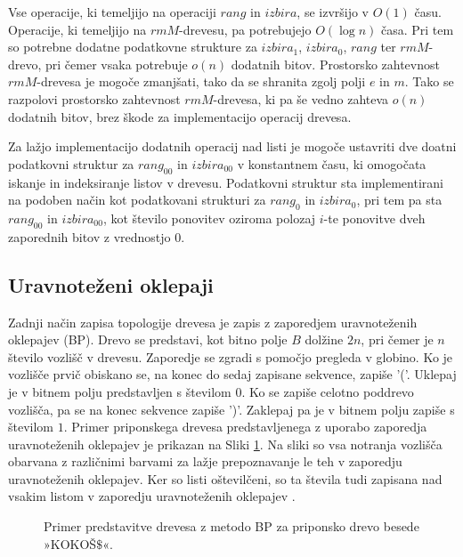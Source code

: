 Vse operacije, ki temeljijo na operaciji $rang$ in $izbira$, se izvršijo v $O(1)$ času. Operacije, ki temeljijo na $rmM$-drevesu, pa potrebujejo $O(\log{n})$ časa. Pri tem so potrebne dodatne podatkovne strukture za $izbira_1$, $izbira_0$, $rang$ ter $rmM$-drevo, pri čemer vsaka potrebuje $o(n)$ dodatnih bitov. Prostorsko zahtevnost $rmM$-drevesa je mogoče zmanjšati, tako da se shranita zgolj polji $e$ in $m$. Tako se razpolovi prostorsko zahtevnost $rmM$-drevesa, ki pa še vedno zahteva $o(n)$ dodatnih bitov, brez škode za implementacijo operacij drevesa.

Za lažjo implementacijo dodatnih operacij nad listi je mogoče ustavriti dve doatni podatkovni struktur za $rang_{00}$ in $izbira_{00}$ v konstantnem času, ki omogočata iskanje in indeksiranje listov v drevesu. Podatkovni struktur sta implementirani na podoben način kot podatkovani strukturi za $rang_0$ in $izbira_0$, pri tem pa sta $rang_{00}$ in $izbira_{00}$, kot število ponovitev oziroma polozaj $i$-te ponovitve dveh zaporednih bitov z vrednostjo 0.

\subsection{Uravnoteženi oklepaji}\label{sec:oklepaji}

Zadnji način zapisa topologije drevesa je zapis z zaporedjem uravnoteženih oklepajev (BP). Drevo se predstavi, kot bitno polje $B$ dolžine $2n$, pri čemer je $n$ število vozlišč v drevesu. Zaporedje se zgradi s pomočjo pregleda v globino. Ko je vozlišče prvič obiskano se, na konec do sedaj zapisane sekvence, zapiše '('. Uklepaj je v bitnem polju predstavljen s številom $0$. Ko se zapiše celotno poddrevo vozlišča, pa se na konec sekvence zapiše ')'. Zaklepaj pa je v bitnem polju zapiše s številom $1$. Primer priponskega drevesa predstavljenega z uporabo zaporedja uravnoteženih oklepajev je prikazan na Sliki \ref{fig:BP}. Na sliki so vsa notranja vozlišča obarvana z različnimi barvami za lažje prepoznavanje le teh v zaporedju uravnoteženih oklepajev. Ker so listi oštevilčeni, so ta števila tudi zapisana nad vsakim listom v zaporedju uravnoteženih oklepajev \cite{Navarro2016}.

\begin{figure}[htb]
    \begin{center}
        
        \caption{Primer predstavitve drevesa z metodo BP za priponsko drevo besede »KOKOŠ$\$$«.} 
        \label{fig:BP}
    \end{center}
\end{figure}

